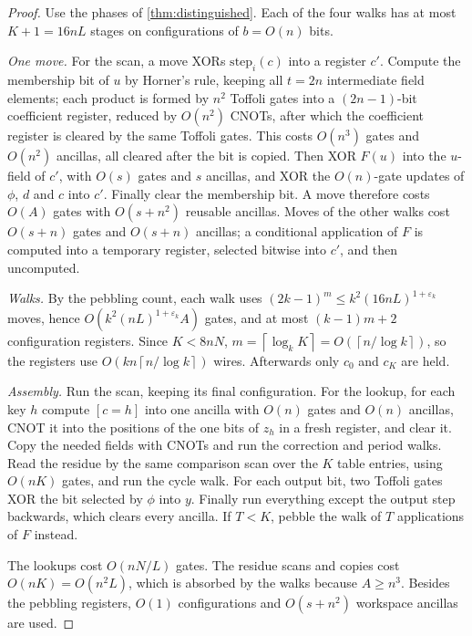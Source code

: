 \documentclass[11pt]{article}
\theoremstyle{definition}
\theoremstyle{remark}
\newcommand{\ceil}[1]{\left\lceil #1\right\rceil}
\numberwithin{equation}{section}
\begin{document}
\begin{proof}
Use the phases of \cref{thm:distinguished}.  Each of the four walks has
at most $K+1=16nL$ stages on configurations of $b=O(n)$ bits.

\emph{One move.}  For the scan, a move XORs $\mathrm{step}_i(c)$ into a
register $c'$.  Compute the membership bit of $u$ by Horner's rule,
keeping all $t=2n$ intermediate field elements; each product is formed
by $n^2$ Toffoli gates into a $(2n-1)$-bit coefficient register, reduced
by $O(n^2)$ CNOTs, after which the coefficient register is cleared by the
same Toffoli gates.  This costs $O(n^3)$ gates and $O(n^2)$ ancillas, all
cleared after the bit is copied.  Then XOR $F(u)$ into the $u$-field of
$c'$, with $O(s)$ gates and $s$ ancillas, and XOR the $O(n)$-gate updates
of $\phi$, $d$ and $c$ into $c'$.  Finally clear the membership bit.  A
move therefore costs $O(A)$ gates with $O(s+n^2)$ reusable ancillas.
Moves of the other walks cost $O(s+n)$ gates and $O(s+n)$ ancillas; a
conditional application of $F$ is computed into a temporary register,
selected bitwise into $c'$, and then uncomputed.

\emph{Walks.}  By the pebbling count, each walk uses
$(2k-1)^m\leq k^2(16nL)^{1+\varepsilon_k}$ moves, hence
$O(k^2(nL)^{1+\varepsilon_k}A)$ gates, and at most $(k-1)m+2$
configuration registers.  Since $K<8nN$,
$m=\ceil{\log_kK}=O(\ceil{n/\log k})$, so the registers use
$O(kn\ceil{n/\log k})$ wires.  Afterwards only $c_0$ and $c_K$ are held.

\emph{Assembly.}  Run the scan, keeping its final configuration.  For the
lookup, for each key $h$ compute $[c=h]$ into one ancilla with $O(n)$
gates and $O(n)$ ancillas, CNOT it into the positions of the one bits of
$z_h$ in a fresh register, and clear it.  Copy the needed fields with
CNOTs and run the correction and period walks.  Read the residue by the
same comparison scan over the $K$ table entries, using $O(nK)$ gates, and
run the cycle walk.  For each output bit, two Toffoli gates XOR the bit
selected by $\phi$ into $y$.  Finally run everything except the output
step backwards, which clears every ancilla.  If $T<K$, pebble the walk
of $T$ applications of $F$ instead.

The lookups cost $O(nN/L)$ gates.  The residue scans and copies cost
$O(nK)=O(n^2L)$, which is absorbed by the walks because $A\geq n^3$.
Besides the pebbling registers, $O(1)$ configurations and $O(s+n^2)$
workspace ancillas are used.
\end{proof}
\end{document}
